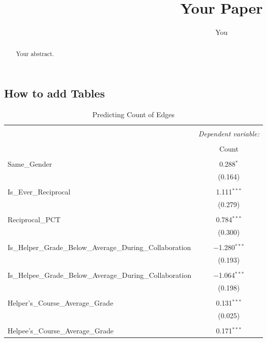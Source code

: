 \documentclass[a4paper]{article}
\title{Your Paper}
\author{You}
\begin{document}
\maketitle

\begin{abstract}
Your abstract.
\end{abstract}

\subsection{How to add Tables}

\begin{table}[!htbp] \centering 
  \caption{Predicting Count of Edges} 
  \label{} 
\begin{tabular}{@{\extracolsep{5pt}}lc} 
\\[-1.8ex]\hline 
\hline \\[-1.8ex] 
 & \multicolumn{1}{c}{\textit{Dependent variable:}} \\ 
\cline{2-2} 
\\[-1.8ex] & Count \\ 
\hline \\[-1.8ex] 
 Same\_Gender & 0.288$^{*}$ \\ 
  & (0.164) \\ 
  & \\ 
 Is\_Ever\_Reciprocal & 1.111$^{***}$ \\ 
  & (0.279) \\ 
  & \\ 
 Reciprocal\_PCT & 0.784$^{***}$ \\ 
  & (0.300) \\ 
  & \\ 
 Is\_Helper\_Grade\_Below\_Average\_During\_Collaboration  & $-$1.280$^{***}$ \\ 
  & (0.193) \\ 
  & \\ 
Is\_Helpee\_Grade\_Below\_Average\_During\_Collaboration & $-$1.064$^{***}$ \\ 
  & (0.198) \\ 
  & \\ 
Helper's\_Course\_Average\_Grade & 0.131$^{***}$ \\ 
  & (0.025) \\ 
  & \\ 
Helpee's\_Course\_Average\_Grade & 0.171$^{***}$ \\ 

\end{tabular}
\end{table}
\end{document}
